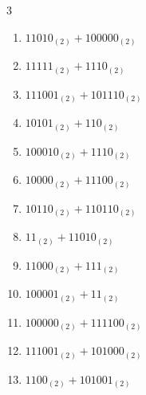 \begin{multicols}{3}
\begin{enumerate}
  \item $11010_{(2)} + 100000_{(2)}$


  \item $11111_{(2)} + 1110_{(2)}$


  \item $111001_{(2)} + 101110_{(2)}$


  \item $10101_{(2)} + 110_{(2)}$


  \item $100010_{(2)} + 1110_{(2)}$


  \item $10000_{(2)} + 11100_{(2)}$


  \item $10110_{(2)} + 110110_{(2)}$


  \item $11_{(2)} + 11010_{(2)}$


  \item $11000_{(2)} + 111_{(2)}$


\columnbreak %

\resetques

  \item $100001_{(2)} + 11_{(2)}$


  \item $100000_{(2)} + 111100_{(2)}$


  \item $111001_{(2)} + 101000_{(2)}$


  \item $1100_{(2)} + 101001_{(2)}$



\end{enumerate}
\end{multicols}
